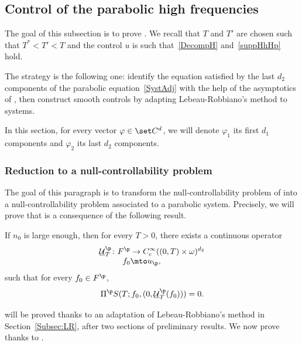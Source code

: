 \subsection{Control of the parabolic high frequencies} \label{subsec:parab}
The goal of this subsection is to prove . We recall that $T$ and $T'$ are chosen such that $T^*<T'<T$ and the control $u$ is such that~\eqref{DecompH} and~\eqref{suppHhHp} hold.

The strategy is the following one: identify the equation satisfied by the last $d_2$ components of the parabolic equation~\eqref{SystAdj} with the help of the asymptotics of , then construct smooth controls by adapting Lebeau-Robbiano's method to systems.

In this section, for every vector $\varphi\in\set C^d$, we will denote $\varphi_1$ its first $d_1$ components and $\varphi_2$ its last $d_2$ components.

\subsubsection{Reduction to a null-controllability problem}\label{sec:reduc_parab}

The goal of this paragraph is to transform the null-controllability problem of  into a null-controllability problem associated to a parabolic system. Precisely, we will prove that  is a consequence of the following result.

\begin{prop}
\label{LemPar_Bis}
If $n_0$ is large enough, then for every $T>0$, there exists a continuous operator\vspace*{-3pt}
\begin{align*}
\underline{\mathcal{U}}_T^\p \colon
F^\p & \to C^\infty_c((0,T)\times\omega)^{d_2} \\[-3pt]
f_0 &\mto u_{\p},
\end{align*}
such that for every $f_0 \in F^\p$,
\begin{equation*}
\Pi^{\p} S(T; f_0, (0, \underline{\mathcal{U}}_T^\p(f_0))) = 0.
\end{equation*}
\end{prop}

 will be proved thanks to an adaptation of Lebeau-Robbiano's method in Section~\ref{Subsec:LR}, after two sections of preliminary results. We now prove  thanks to .

